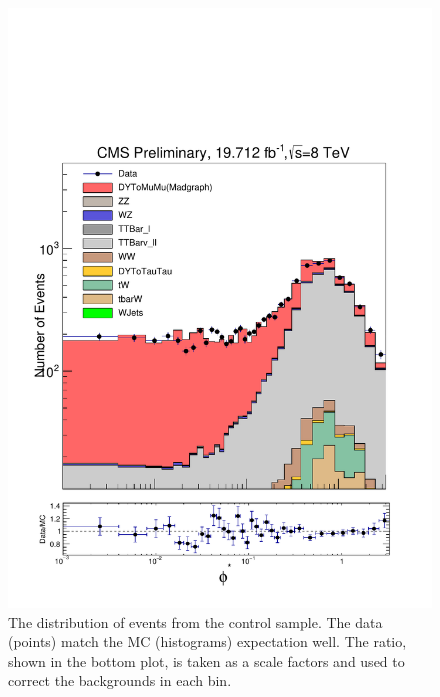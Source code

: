\begin{figure}[!htbp]
    \centering
    \includegraphics[width=\textwidth]{figures/phistar_emu.pdf}
    \caption[
        The \phistar distribution of events from the \emu control sample.
    ]{
        The \phistar distribution of events from the \emu control sample. The
        data (points) match the MC (histograms) expectation well. The ratio,
        shown in the bottom plot, is taken as a scale factors and used to
        correct the backgrounds in each bin.
    }
    \label{fig:emu_background_check}
\end{figure}

